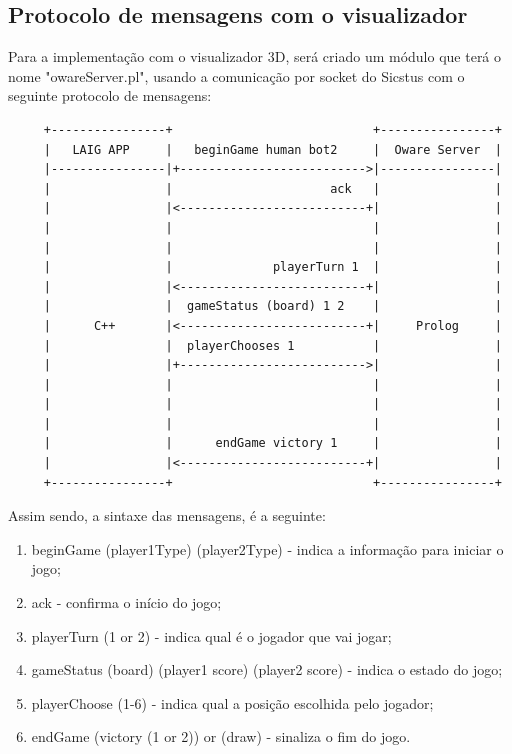 \documentclass[15pt,a4paper]{article}
\begin{document}
\newpage

\subsection{Protocolo de mensagens com o visualizador}
Para a implementação com o visualizador 3D, será criado um módulo que terá o nome "owareServer.pl", usando a comunicação por socket do Sicstus com o seguinte protocolo de mensagens:
\begin{verbatim}
     +----------------+                            +----------------+
     |   LAIG APP     |   beginGame human bot2     |  Oware Server  |
     |----------------|+-------------------------->|----------------|
     |                |                      ack   |                |
     |                |<--------------------------+|                |
     |                |                            |                |
     |                |                            |                |
     |                |              playerTurn 1  |                |
     |                |<--------------------------+|                |
     |                |  gameStatus (board) 1 2    |                |
     |      C++       |<--------------------------+|     Prolog     |
     |                |  playerChooses 1           |                |
     |                |+-------------------------->|                |
     |                |                            |                |
     |                |                            |                |
     |                |                            |                |
     |                |      endGame victory 1     |                |
     |                |<--------------------------+|                |
     +----------------+                            +----------------+
\end{verbatim}
Assim sendo, a sintaxe das mensagens, é a seguinte:
\begin{enumerate}
\item beginGame (player1Type) (player2Type) - indica a informação para iniciar o jogo;
\item ack - confirma o início do jogo;
\item playerTurn (1 or 2) - indica qual é o jogador que vai jogar;
\item gameStatus (board) (player1 score) (player2 score) - indica o estado do jogo;
\item playerChoose (1-6) - indica qual a posição escolhida pelo jogador;
\item endGame (victory (1 or 2)) or (draw) - sinaliza o fim do jogo.
\end{enumerate}
\end{document}
